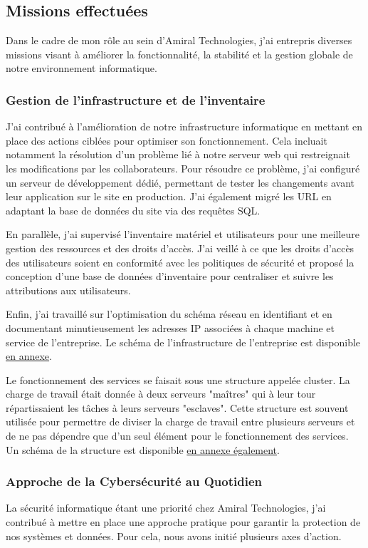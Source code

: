 \subsection{Missions effectuées}
Dans le cadre de mon rôle au sein d'Amiral Technologies, j'ai entrepris diverses missions visant à améliorer la fonctionnalité, la stabilité et la gestion globale de notre environnement informatique.

\subsubsection{Gestion de l'infrastructure et de l'inventaire}
J'ai contribué à l'amélioration de notre infrastructure informatique en mettant en place des actions ciblées pour optimiser son fonctionnement.
Cela incluait notamment la résolution d'un problème lié à notre serveur web qui restreignait les modifications par les collaborateurs.
Pour résoudre ce problème, j'ai configuré un serveur de développement dédié, permettant de tester les changements avant leur application sur le site en production.
J'ai également migré les URL en adaptant la base de données du site via des requêtes SQL.

En parallèle, j'ai supervisé l'inventaire matériel et utilisateurs pour une meilleure gestion des ressources et des droits d'accès.
J'ai veillé à ce que les droits d'accès des utilisateurs soient en conformité avec les politiques de sécurité et proposé la conception d'une base de données d'inventaire pour centraliser et suivre les attributions aux utilisateurs.

Enfin, j'ai travaillé sur l'optimisation du schéma réseau en identifiant et en documentant minutieusement les adresses IP associées à chaque machine et service de l'entreprise.
Le schéma de l'infrastructure de l'entreprise est disponible \hyperref[infra]{en annexe}.

Le fonctionnement des services se faisait sous une structure appelée cluster.
La charge de travail était donnée à deux serveurs "maîtres" qui à leur tour répartissaient les tâches à leurs serveurs "esclaves".
Cette structure est souvent utilisée pour permettre de diviser la charge de travail entre plusieurs serveurs et de ne pas dépendre que d'un seul élément pour le fonctionnement des services.
Un schéma de la structure est disponible \hyperref[balancer]{en annexe également}.

\subsubsection{Approche de la Cybersécurité au Quotidien}
La sécurité informatique étant une priorité chez Amiral Technologies, j'ai contribué à mettre en place une approche pratique pour garantir la protection de nos systèmes et données.
Pour cela, nous avons initié plusieurs axes d'action.

